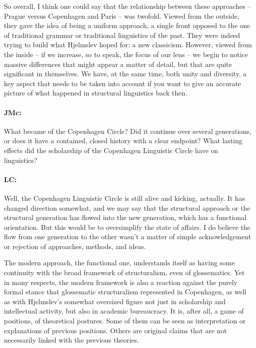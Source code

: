 \documentclass[output=paper]{langscibook}
\begin{document}
\begin{sloppypar}So overall, I think one could say that the relationship between these approaches – Prague versus Copenhagen and Paris – was twofold. Viewed from the outside, they gave the idea of being a uniform approach, a single front opposed to the one of traditional grammar or traditional linguistics of the past. They were indeed trying to build what Hjelmslev hoped for: a new classicism. However, viewed from the inside – if we increase, so to speak, the focus of our lens – we begin to notice massive differences that might appear a matter of detail, but that are quite significant in themselves. We have, at the same time, both unity and diversity, a key aspect that needs to be taken into account if you want to give an accurate picture of what happened in structural linguistics back then.\end{sloppypar}

\paragraph*{JMc:} What became of the Copenhagen Circle? Did it continue over several generations, or does it have a contained, closed history with a clear endpoint? What lasting effects did the scholarship of the Copenhagen Linguistic Circle have on linguistics?

\paragraph*{LC:} Well, the Copenhagen Linguistic Circle is still alive and kicking, actually. It has changed direction somewhat, and we may say that the structural approach or the structural generation has flowed into the new generation, which has a functional orientation. But this would be to oversimplify the state of affairs. I do believe the flow from one generation to the other wasn’t a matter of simple acknowledgement or rejection of approaches, methods, and ideas.

The modern approach, the functional one, understands itself as having some continuity with the broad framework of structuralism, even of glossematics. Yet in many respects, the modern framework is also a reaction against the purely formal stance that glossematic structuralism represented in Copenhagen, as well as with Hjelmslev’s somewhat oversized figure not just in scholarship and intellectual activity, but also in academic bureaucracy. It is, after all, a game of positions, of theoretical postures. Some of them can be seen as interpretation or explanations of previous positions. Others are original claims that are not necessarily linked with the previous theories. 
\end{document}
